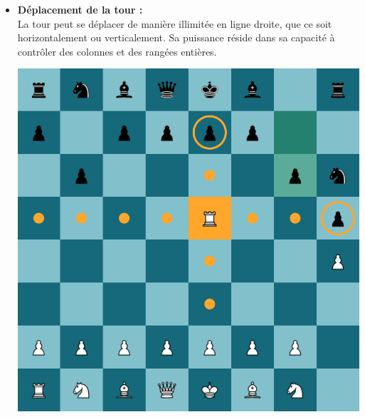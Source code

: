 \documentclass{article}
\begin{document}
\begin{itemize}
    \item \begin{minipage}{0.45\textwidth}
        \textbf{Déplacement de la tour :} \\
        La tour peut se déplacer de manière illimitée en ligne droite, que ce soit horizontalement ou verticalement.
        Sa puissance réside dans sa capacité à contrôler des colonnes et des rangées entières.
    \end{minipage}
    \hspace{0.05\textwidth}
    \begin{minipage}{0.45\textwidth}
        \centering
        \includegraphics[width=\textwidth]{tourMove.png}
    \end{minipage}

    \vspace{0.5cm}


\end{itemize}
\end{document}
